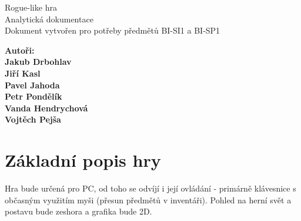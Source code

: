 \documentclass[12pt,a4paper]{article}
\begin{document}


\renewcommand{\headrulewidth}{0pt}
\renewcommand{\footrulewidth}{0pt}

\begin{titlepage}
  \thispagestyle{fancy}
  
	\vspace*{\fill}
	\begin{center}
    {\fontsize{28.83}{100}\selectfont Rogue-like hra}\\[0.6cm] %
		{\fontsize{15.74}{40}\selectfont Analytická dokumentace}\\[1.5cm]
    {\fontsize{10}{10} \selectfont Dokument vytvořen pro potřeby předmětů
    BI-SI1 a BI-SP1}\\
	\end{center}
  
	\vspace*{\fill}
  
  {\fontsize{10}{10} \selectfont \noindent
  \bf Autoři:\rm\\
  Jakub Drbohlav\\
  Jiří Kasl\\
  Pavel Jahoda\\
  Petr Pondělík\\
  Vanda Hendrychová\\
  Vojtěch Pejša\\
  }
\end{titlepage}

\newpage

\renewcommand{\headrulewidth}{0.4pt}
\renewcommand{\footrulewidth}{0.4pt}






\tableofcontents

\newpage





\section{Základní popis hry}
Hra bude určená pro PC, od toho se odvíjí i její ovládání - primárně klávesnice
s občasným využitím myši (přesun předmětů v inventáři). Pohled na herní svět a
postavu bude zeshora a grafika bude 2D.
\end{document}

